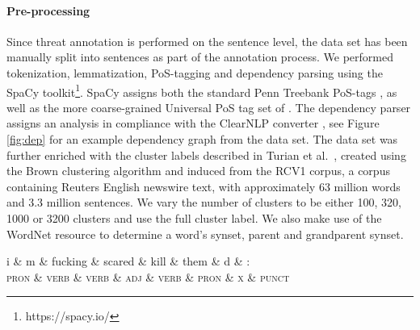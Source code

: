 \documentclass[11pt,letterpaper]{article}
\let\tag=\textsc
\begin{document}
\paragraph{Pre-processing}Since threat annotation is performed on the sentence level, the data
set has been manually split into sentences as part of the annotation
process.  We performed tokenization, lemmatization, PoS-tagging and
dependency parsing using the SpaCy
toolkit\footnote{https://spacy.io/}.  SpaCy assigns both the standard
Penn Treebank PoS-tags \cite{Mar:San:Mar:93}, as well as the more
coarse-grained Universal PoS tag set of . The
dependency parser assigns an analysis in compliance with the ClearNLP
converter \cite{Cho:Pal:12}, see Figure \ref{fig:dep} for an example
dependency graph from the data set. The data set was further enriched
with the cluster labels described in Turian et
al.~, created using the Brown clustering
algorithm \cite{Bro:deS:Mer:92} and induced from the RCV1 corpus, a
corpus containing Reuters English newswire text, with approximately 63
million words and 3.3 million sentences. We vary the number of
clusters to be either 100, 320, 1000 or 3200 clusters and use the full
cluster label.  We also make use of the WordNet resource
\cite{wordnet} to determine a word's synset, parent and grandparent
synset.

\begin{figure*}
\begin{center}
\begin{dependency}[arc edge, text only label, theme=simple]
  \begin{deptext}[column sep=.2cm]
    i \& m \& fucking \& scared \& kill \& them \& d \& : \\
   \tag{\smaller pron} \& \tag{\smaller verb} \& \tag{\smaller verb} \& \tag{\smaller adj} \& \tag{\smaller verb} \& \tag{\smaller pron} \& \tag{\smaller x} \& \tag{\smaller punct} \\
  \end{deptext}
\end{dependency}
\caption{Dependency parse of example sentence from the data set, with assigned uPOS tags.}
\label{fig:dep}
\end{center}
\end{figure*}
\end{document}

